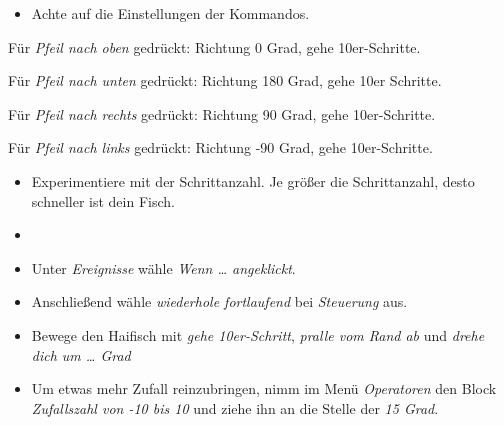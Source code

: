 \documentclass{article}
\begin{document}
\begin{itemize}[left=0pt]
    \item Achte auf die Einstellungen der Kommandos.
\end{itemize}
Für \textit{Pfeil nach oben} gedrückt: Richtung 0 Grad, gehe 10er-Schritte. 

Für \textit{Pfeil nach unten} gedrückt: Richtung 180 Grad, gehe 10er Schritte.
    
Für \textit{Pfeil nach rechts} gedrückt: Richtung 90 Grad, gehe 10er-Schritte.
    
Für \textit{Pfeil nach links} gedrückt: Richtung -90 Grad, gehe 10er-Schritte.       


\begin{itemize}[left=0pt]
        \item Experimentiere mit der Schrittanzahl. Je größer die Schrittanzahl, desto schneller ist dein Fisch.
        \item {}
\end{itemize}


\begin{itemize}[left=0pt]
    \item Unter \textit{Ereignisse} wähle \textit{Wenn … angeklickt}.
    \item Anschließend wähle \textit{wiederhole fortlaufend} bei \textit{Steuerung} aus.
    \item Bewege den Haifisch mit \textit{gehe 10er-Schritt}, \textit{pralle vom Rand ab} und \textit{drehe dich um … Grad}
    \item Um etwas mehr Zufall reinzubringen, nimm im Menü \textit{Operatoren} den Block \textit{Zufallszahl von -10 bis 10} und ziehe ihn an die Stelle der \textit{15 Grad}.
\end{itemize}
\end{document}
